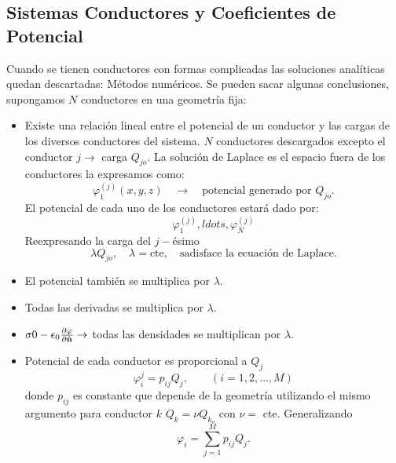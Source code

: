 \subsection{Sistemas Conductores y Coeficientes de Potencial}
Cuando se tienen conductores con formas complicadas las soluciones analíticas quedan descartadas: Métodos numéricos. Se pueden sacar algunas conclusiones, supongamos $N$ conductores en una geometría fija:
\begin{itemize}
	\item Existe una relación lineal entre el potencial de un conductor y las cargas de los diversos conductores del sistema. $N$ conductores descargados excepto el conductor $j\to$ carga $Q_{jo}$. La solución de Laplace es el espacio fuera de los conductores la expresamos como:
	\begin{equation}
		\varphi _1 ^{(j)} (x,y,z) \quad \to \quad \text{potencial generado por } Q_{jo}.
	\end{equation}
	El potencial de cada uno de los conductores estará dado por:
	\begin{equation}
		\varphi _1 ^{(j)}, ldots, \varphi _N ^{(j)}
	\end{equation}
	Reexpresando la carga del $j-$ésimo
	$$ \lambda Q_{jo}, \quad \lambda = \text{cte}, \quad \text{sadisface la ecuación de Laplace.} $$
	\item El potencial también se multiplica por $\lambda $.
	\item Todas las derivadas se multiplica por $\lambda$.
	\item $\sigma 0 -\epsilon_0 \pdv{\varphi}{\vu{n}} \to$ todas las densidades se multiplican por $\lambda$.
	\item Potencial de cada conductor es proporcional a $Q_j$
	\begin{equation}
		\varphi _i ^j = p_{ij} Q_j, \qquad (i = 1,2,\ldots ,M)
	\end{equation}
	donde $p_{ij}$ es constante que depende de la geometría utilizando el mismo argumento para conductor $k$ $Q_k = \nu Q_{k_o}$ con $\nu =$ cte. Generalizando
	\begin{equation}
		\varphi _i = \sum _{j=1} ^{M} p_{ij} Q_j.
	\end{equation}
\end{itemize}










